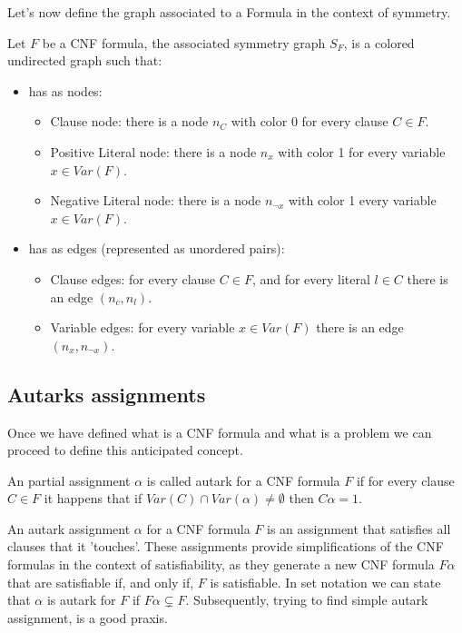 Let's now define the graph associated to a Formula in the context of symmetry.

\begin{definition}
  Let $F$ be a CNF formula, the associated symmetry graph $S_F$, is a colored undirected graph such that:
  \begin{itemize}
  \item has as nodes:
    \begin{itemize}
    \item Clause node: there is a node $n_C$ with color 0 for every clause $C \in F$.
    \item Positive Literal node: there is a node $n_x$ with color 1 for every variable $x\in Var(F)$.
    \item Negative Literal node: there is a node $n_{\neg x}$ with color 1 every variable $x\in Var(F)$.
    \end{itemize}
  \item has as edges (represented as unordered pairs):
    \begin{itemize}
    \item Clause edges: for every clause $C\in F$, and for every literal $l\in C$ there is an edge $(n_c, n_l)$.
    \item Variable edges: for every variable $x\in Var(F)$ there is an edge $(n_x,n_{\neg x})$.
    \end{itemize}
  \end{itemize}
\end{definition}






\subsection{Autarks assignments}
\label{sec:autark}

Once we have defined what is a CNF formula and what is a problem we can proceed to define this anticipated concept.

\begin{definition}
  An partial assignment $\alpha$ is called autark for a CNF formula $F$ if for every clause $C \in F$ it happens that if $Var(C) \cap Var(\alpha) \ne \emptyset $ then $C\alpha = 1$.
\end{definition}

An autark assignment $\alpha$  for a CNF formula $F$ is an assignment that satisfies all clauses that it 'touches'. These assignments provide simplifications of the CNF formulas in the context of satisfiability, as they generate a new CNF formula $F\alpha$ that are satisfiable if, and only if,  $F$ is satisfiable. In set notation we can state that $\alpha$ is autark for $F$ if $F\alpha \subsetneq F$. Subsequently, trying to find simple autark assignment, is a good praxis.\\


